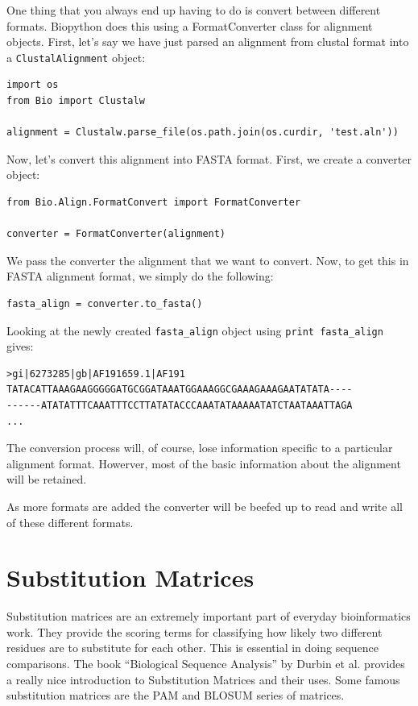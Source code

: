 \documentclass{report}
\begin{document}
One thing that you always end up having to do is convert between different formats. Biopython does this using a FormatConverter class for alignment objects. First, let's say we have just parsed an alignment from clustal format into a \verb|ClustalAlignment| object:

\begin{verbatim}
import os
from Bio import Clustalw

alignment = Clustalw.parse_file(os.path.join(os.curdir, 'test.aln'))
\end{verbatim}

Now, let's convert this alignment into FASTA format. First, we create a converter object:

\begin{verbatim}
from Bio.Align.FormatConvert import FormatConverter

converter = FormatConverter(alignment)
\end{verbatim}

We pass the converter the alignment that we want to convert. Now, to get this in FASTA alignment format, we simply do the following:

\begin{verbatim}
fasta_align = converter.to_fasta()
\end{verbatim}

Looking at the newly created \verb|fasta_align| object using \verb|print fasta_align| gives:

\begin{verbatim}
>gi|6273285|gb|AF191659.1|AF191
TATACATTAAAGAAGGGGGATGCGGATAAATGGAAAGGCGAAAGAAAGAATATATA----
------ATATATTTCAAATTTCCTTATATACCCAAATATAAAAATATCTAATAAATTAGA
...
\end{verbatim}

The conversion process will, of course, lose information specific to a particular alignment format. Howerver, most of the basic information about the alignment will be retained.


As more formats are added the converter will be beefed up to read and write all of these different formats.

\section{Substitution Matrices}
\label{sec:sub_matrix}

Substitution matrices are an extremely important part of everyday bioinformatics work. They provide the scoring terms for classifying how likely two different residues are to substitute for each other. This is essential in doing sequence comparisons. The book ``Biological Sequence Analysis'' by Durbin et al. provides a really nice introduction to Substitution Matrices and their uses. Some famous substitution matrices are the PAM and BLOSUM series of matrices.
\end{document}
